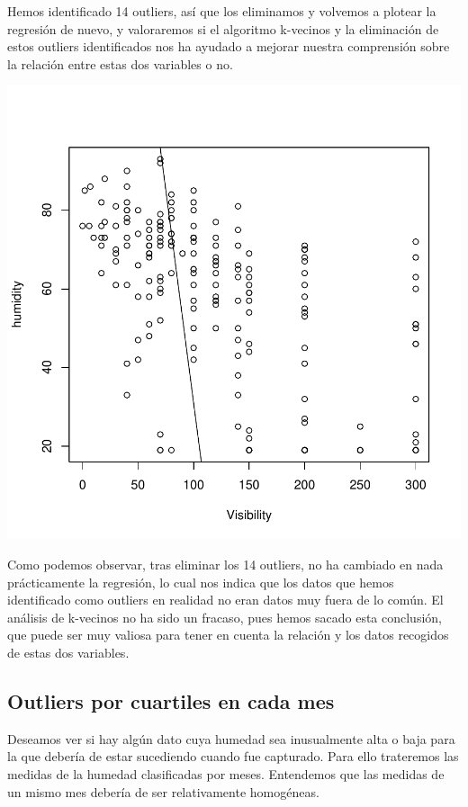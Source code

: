 \documentclass [a4paper] {article}
\begin{document}
Hemos identificado 14 outliers, así que los eliminamos y volvemos a plotear la regresión de nuevo, y valoraremos si el algoritmo k-vecinos y la eliminación 
de estos outliers identificados nos ha ayudado a mejorar nuestra comprensión sobre la relación entre estas dos variables o no.

\begin{center}
\includegraphics{entrega-analisissinoutlierskvecinos}
\end{center}

Como podemos observar, tras eliminar los 14 outliers, no ha cambiado en nada prácticamente la regresión, lo cual nos indica que los datos que hemos 
identificado como outliers en realidad no eran datos muy fuera de lo común. El análisis de k-vecinos no ha sido un fracaso, pues hemos sacado esta 
conclusión, que puede ser muy valiosa para tener en cuenta la relación y los datos recogidos de estas dos variables.



\newpage
\subsection{Outliers por cuartiles en cada mes}

Deseamos ver si hay algún dato cuya humedad sea inusualmente alta o baja para la que debería de estar sucediendo cuando fue capturado.
Para ello trateremos las medidas de la humedad clasificadas por meses.
Entendemos que las medidas de un mismo mes debería de ser relativamente homogéneas.
\end{document}
